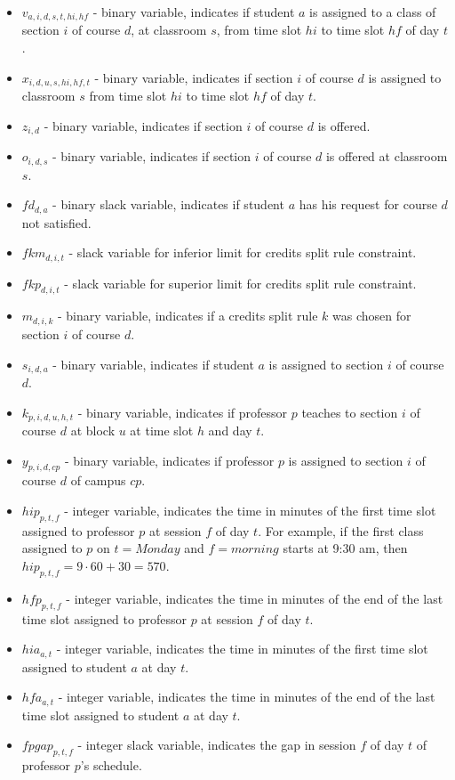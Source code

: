 \begin{itemize}
\item $v_{a,i,d,s,t,hi,hf}$ - binary variable, indicates if student $a$ is assigned to a class of section $i$ of course $d$, at classroom $s$, from time slot $hi$ to time slot $hf$ of day $t$. 
\item $x_{i,d,u,s,hi,hf,t}$ - binary variable, indicates if section $i$ of course $d$ is assigned to classroom $s$ from time slot $hi$ to time slot $hf$ of day $t$. 
\item $z_{i,d}$ - binary variable, indicates if section $i$ of course $d$ is offered. 
\item $o_{i,d,s}$ - binary variable, indicates if section $i$ of course $d$ is offered at classroom $s$. 
\item $fd_{d,a}$ - binary slack variable, indicates if student $a$ has his request for course $d$ not satisfied.
\item $fkm_{d,i,t}$ - slack variable for inferior limit for credits split rule constraint. 
\item $fkp_{d,i,t}$ - slack variable for superior limit for credits split rule constraint.
\item $m_{d,i,k}$ - binary variable, indicates if a credits split rule $k$ was chosen for section $i$ of course $d$.
\item $s_{i,d,a}$ - binary variable, indicates if student $a$ is assigned to section $i$ of course $d$.
\item $k_{p,i,d,u,h,t}$ - binary variable, indicates if professor $p$ teaches to section $i$ of course $d$ at block $u$ at time slot $h$ and day $t$.
\item $y_{p,i,d,cp}$ - binary variable, indicates if professor $p$ is assigned to section $i$ of course $d$ of campus $cp$.
\item $hip_{p,t,f}$ - integer variable, indicates the time in minutes of the first time slot assigned to professor $p$ at session $f$ of day $t$. For example, if the first class assigned to $p$ on $t=Monday$ and $f=morning$ starts at 9:30 am, then $hip_{p,t,f}=9\cdot 60 + 30 = 570$.
\item $hfp_{p,t,f}$ - integer variable, indicates the time in minutes of the end of the last time slot assigned to professor $p$ at session $f$ of day $t$.
\item $hia_{a,t}$ - integer variable, indicates the time in minutes of the first time slot assigned to student $a$ at day $t$.
\item $hfa_{a,t}$ - integer variable, indicates the time in minutes of the end of the last time slot assigned to student $a$ at day $t$.
\item $fpgap_{p,t,f}$ - integer slack variable, indicates the gap in session $f$ of day $t$ of professor $p$'s schedule.
\end{itemize}


